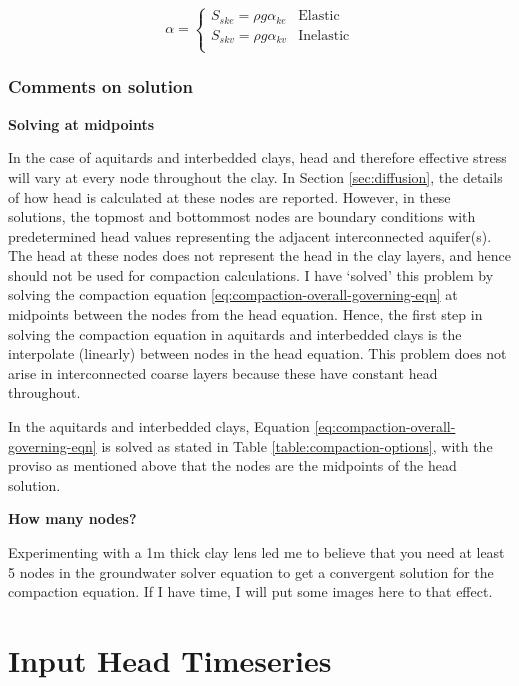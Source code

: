 \documentclass{article}
\begin{document}
\begin{equation}
\label{eq:skeletal-specific-storage}
\alpha = 
\begin{cases}
S_{ske} = \rho g \alpha_{ke} & \text{Elastic} \\
S_{skv} = \rho g \alpha_{kv} & \text{Inelastic} \\
\end{cases}
\end{equation}

\subsubsection{Comments on solution}

\textbf{Solving at midpoints}

In the case of aquitards and interbedded clays, head and therefore effective stress will vary at every node throughout the clay. In Section \ref{sec:diffusion}, the details of how head is calculated at these nodes are reported. However, in these solutions, the topmost and bottommost nodes are boundary conditions with predetermined head values representing the adjacent interconnected aquifer(s). The head at these nodes does not represent the head in the clay layers, and hence should not be used for compaction calculations. I have `solved' this problem by solving the compaction equation \ref{eq:compaction-overall-governing-eqn} at midpoints between the nodes from the head equation. Hence, the first step in solving the compaction equation in aquitards and interbedded clays is the interpolate (linearly) between nodes in the head equation. This problem does not arise in interconnected coarse layers because these have constant head throughout.

In the aquitards and interbedded clays, Equation \ref{eq:compaction-overall-governing-eqn} is solved as stated in Table \ref{table:compaction-options}, with the proviso as mentioned above that the nodes are the midpoints of the head solution. 

\textbf{How many nodes?}

Experimenting with a 1m thick clay lens led me to believe that you need at least 5 nodes in the groundwater solver equation to get a convergent solution for the compaction equation. If I have time, I will put some images here to that effect.

\section{Input Head Timeseries}
\end{document}
